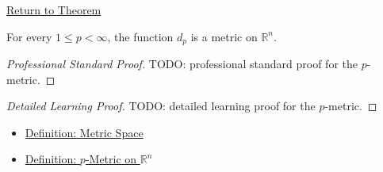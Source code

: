 \newpage
{}
\label{prf:lp-metric-rn}

\begin{remark*}[Return]
\hyperref[thm:lp-metric-rn]{Return to Theorem}
\end{remark*}

\begin{theorem*}[\(d_p\) is a Metric]
For every \(1\leq p<\infty\), the function \(d_p\) is a metric on
\(\mathbb{R}^n\).
\end{theorem*}

\begin{proof}[Professional Standard Proof]
\LRAProofBodyStart
TODO: professional standard proof for the \(p\)-metric.
\end{proof}

\begin{proof}[Detailed Learning Proof]
\LRAProofBodyStart
TODO: detailed learning proof for the \(p\)-metric.
\end{proof}

\begin{remark*}
\end{remark*}

\begin{dependencies}
\begin{itemize}
  \item \hyperref[def:metric-space]{Definition: Metric Space}
  \item \hyperref[def:lp-metric-rn]{Definition: \(p\)-Metric on \(\mathbb{R}^n\)}
\end{itemize}
\end{dependencies}

\clearpage
